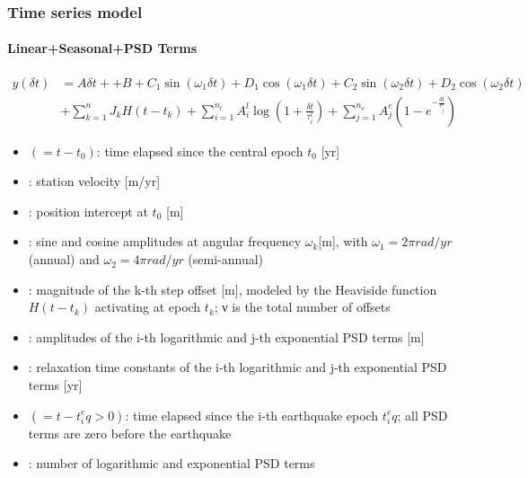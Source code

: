 \begin{frame}
  \frametitle{Time series model}
  \framesubtitle{Linear+Seasonal+PSD Terms}
  \label{}
\begin{align*}
    y(\delta t) &=
      A \delta t +
      + B
      + C_1 \sin(\omega_1 \delta t)
      + D_1 \cos(\omega_1 \delta t)
      + C_2 \sin(\omega_2 \delta t)
      + D_2 \cos(\omega_2 \delta t) \\
      & + \sum_{k=1}^{n} J_k H(t - t_k)
      + \sum_{i=1}^{n_l} A_i^l \log\!\left(1 + \frac{\delta t}{\tau_i^l}\right)
      + \sum_{j=1}^{n_e} A_j^e \left(1 - e^{-\frac{\delta t}{\tau_j^e}}\right)
\end{align*}
\begin{scriptsize}

\begin{itemize}
    \item[$\delta t$] $(= t - t_0)$: time elapsed since the central epoch $t_0$ [yr]
    \item[$A$]:	station velocity [m/yr]
    \item[$B$]:	position intercept at $t_0$ [m]
    \item[$C_k$, $D_k$]: sine and cosine amplitudes at angular frequency $\omega_k$[m], with $\omega_1 = 2π rad/yr$ (annual) and $\omega_2= 4π rad/yr$ (semi-annual)
    \item[$J_k$]: magnitude of the k-th step offset [m], modeled by the Heaviside function $H(t − t_k)$ activating at epoch $t_k$;	ν is the total number of offsets
    \item[$A_i^l$, $A_j^e$]: amplitudes of the i-th logarithmic and j-th exponential PSD terms [m]
    \item[$\tau_i^l, \tau_j^e$]: relaxation time constants of the i-th logarithmic and j-th exponential PSD terms [yr]
    \item[$\Delta t_i$] $(= t − t_i^e q > 0)$: time elapsed since the i-th earthquake epoch $t_i^e q$; all PSD terms are zero before the earthquake
    \item[$n_l$, $n_e$]: number of logarithmic and exponential PSD terms
\end{itemize}
\begin{flushright}
  \citep{itrf2020}
\end{flushright}
\end{scriptsize}
\end{frame}
\note{}

